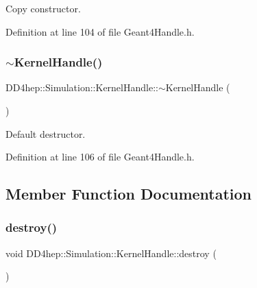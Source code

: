 Copy constructor. 



Definition at line 104 of file Geant4\+Handle.\+h.

\hypertarget{class_d_d4hep_1_1_simulation_1_1_kernel_handle_a66d1b2fafb35c14ac47720c9b184d01d}{}\label{class_d_d4hep_1_1_simulation_1_1_kernel_handle_a66d1b2fafb35c14ac47720c9b184d01d} 
\subsubsection{\texorpdfstring{$\sim$\+Kernel\+Handle()}{~KernelHandle()}}
{\footnotesize\ttfamily D\+D4hep\+::\+Simulation\+::\+Kernel\+Handle\+::$\sim$\+Kernel\+Handle (\begin{DoxyParamCaption}{ }\end{DoxyParamCaption})\hspace{0.3cm}{\ttfamily [inline]}}



Default destructor. 



Definition at line 106 of file Geant4\+Handle.\+h.



\subsection{Member Function Documentation}
\hypertarget{class_d_d4hep_1_1_simulation_1_1_kernel_handle_a955f15990b4af24d3e862c45b99e041f}{}\label{class_d_d4hep_1_1_simulation_1_1_kernel_handle_a955f15990b4af24d3e862c45b99e041f} 
\subsubsection{\texorpdfstring{destroy()}{destroy()}}
{\footnotesize\ttfamily void D\+D4hep\+::\+Simulation\+::\+Kernel\+Handle\+::destroy (\begin{DoxyParamCaption}{ }\end{DoxyParamCaption})}



